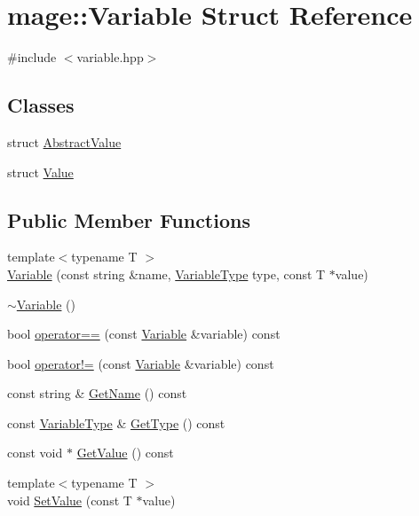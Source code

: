 \hypertarget{structmage_1_1_variable}{}\section{mage\+:\+:Variable Struct Reference}
\label{structmage_1_1_variable}


{\ttfamily \#include $<$variable.\+hpp$>$}

\subsection*{Classes}
\begin{DoxyCompactItemize}
\item 
struct \hyperlink{structmage_1_1_variable_1_1_abstract_value}{Abstract\+Value}
\item 
struct \hyperlink{structmage_1_1_variable_1_1_value}{Value}
\end{DoxyCompactItemize}
\subsection*{Public Member Functions}
\begin{DoxyCompactItemize}
\item 
{\footnotesize template$<$typename T $>$ }\\\hyperlink{structmage_1_1_variable_a86a59487f5ae51954f75a27b6c9487ce}{Variable} (const string \&name, \hyperlink{namespacemage_a530428e73bac0ba7fe84b29086a9e33a}{Variable\+Type} type, const T $\ast$value)
\item 
\hyperlink{structmage_1_1_variable_a8f4d3e950b25b14e996ad074e42a5e9e}{$\sim$\+Variable} ()
\item 
bool \hyperlink{structmage_1_1_variable_a5d1f7965ca7d0e29f6879cda014e8fa9}{operator==} (const \hyperlink{structmage_1_1_variable}{Variable} \&variable) const
\item 
bool \hyperlink{structmage_1_1_variable_a7983cd74a25e3998abac8d89245d1fd9}{operator!=} (const \hyperlink{structmage_1_1_variable}{Variable} \&variable) const
\item 
const string \& \hyperlink{structmage_1_1_variable_a7f70fdadf34cdf6b26adc9910eade11d}{Get\+Name} () const
\item 
const \hyperlink{namespacemage_a530428e73bac0ba7fe84b29086a9e33a}{Variable\+Type} \& \hyperlink{structmage_1_1_variable_a5265e80b2a1c280fad5886174dfc997a}{Get\+Type} () const
\item 
const void $\ast$ \hyperlink{structmage_1_1_variable_a65ecc95bcdc26733394d3a32d3d698f1}{Get\+Value} () const
\item 
{\footnotesize template$<$typename T $>$ }\\void \hyperlink{structmage_1_1_variable_afa9cfd0a42d8a15cccf7f49197648504}{Set\+Value} (const T $\ast$value)
\end{DoxyCompactItemize}
